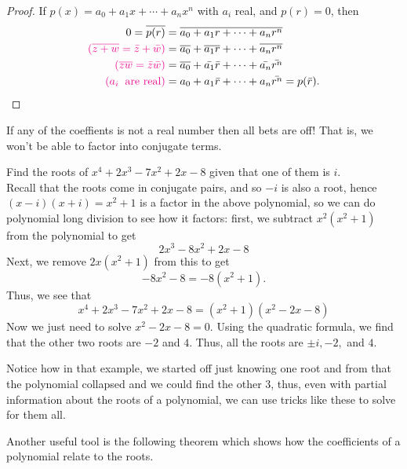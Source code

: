 \documentclass[11pt,dvipsnames]{book}
\numberwithin{equation}{section} %
\numberwithin{figure}{section} %
\numberwithin{table}{section} %
\begin{document}
\begin{proof}
If $p(x)=a_0+a_{1}x+\cdots +a_{n}x^n$ with $a_{i}$ real, and $p(r)=0$, then
\begin{align*}
0 =\overline{p(r)}
 & =\overline{a_0+a_{1}r+\cdots +a_{n}r^n} \\
{\color{magenta} (\overline{z+w}=\bar{z}+\bar{w})} & = \overline{a_0}+\overline{a_1 r}+\cdots + \overline{ a_n r^n} \\ 
{\color{magenta} (\overline{zw}=\bar{z}\bar{w})} & =\overline{a_0}+\bar{a_1} \bar{ r}+\cdots + \bar{ a_n}\bar{ r^n} \\ 
{\color{magenta} (a_{i} \;\; \mbox{are real})} &  ={a_0}+{a_1} \bar{ r}+\cdots + { a_n}\bar{ r^n} = p(\bar{r}).
\end{align*}
 
\end{proof}
 



 If any of the coeffients is not a real number then all bets are off! That is, we won't be able to factor into conjugate terms. \\




\begin{example}
Find the roots of $x^4+2x^3-7x^2+2x-8$ given that one of them is $i$. \\


Recall that the roots come in conjugate pairs, and so $-i$ is also a root, hence $(x-i)(x+i)=x^2+1$ is a factor in the above polynomial, so we can do polynomial long division to see how it factors: first, we subtract $x^2(x^2+1)$ from the polynomial to get
\[
2x^3-8x^2+2x-8\]
Next, we remove $2x(x^2+1)$ from this to get
\[
-8x^2-8=-8(x^2+1).
\]
Thus, we see that 
\[
x^4+2x^3-7x^2+2x-8=(x^2+1)(x^2-2x-8)
\]
Now we just need to solve $x^2-2x-8=0$. Using the quadratic formula, we find that the other two roots are $-2$ and $4$. Thus, all the roots are $\pm i, -2,$ and $4$. 
\end{example}

Notice how in that example, we started off just knowing one root and from that the polynomial collapsed and we could find the other 3, thus, even with partial information about the roots of a polynomial, we can use tricks like these to solve for them all. 



Another useful tool is the following theorem which shows how the coefficients of a polynomial relate to the roots.
\end{document}
